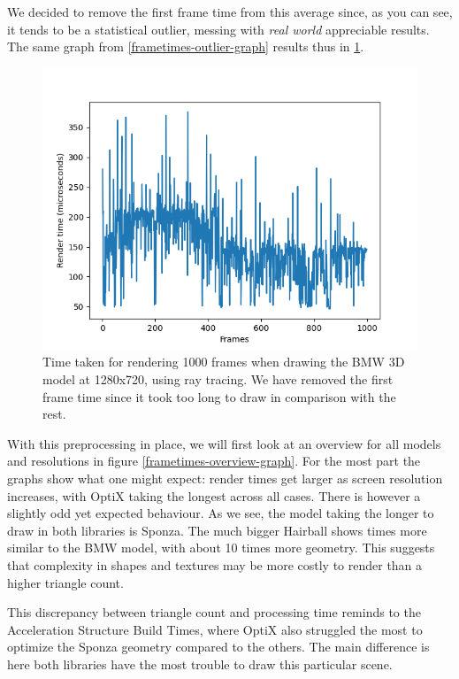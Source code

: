 We decided to remove the first frame time from this average since, as you can see, it tends to be a statistical outlier, messing with \textit{real world} appreciable results. The same graph from \ref{frametimes-outlier-graph} results thus in \ref{frametimes-no-outlier-graph}.

\begin{figure}[hbt!]
    \centering
    \includegraphics[width=1.0\textwidth]{figuras/frametimes-no-outlier.png}
    \caption{Time taken for rendering 1000 frames when drawing the BMW 3D model at 1280x720, using ray tracing. We have removed the first frame time since it took too long to draw in comparison with the rest.}
    \label{frametimes-no-outlier-graph}
\end{figure}

With this preprocessing in place, we will first look at an overview for all models and resolutions in figure \ref{frametimes-overview-graph}. For the most part the graphs show what one might expect: render times get larger as screen resolution increases, with OptiX taking the longest across all cases. There is however a slightly odd yet expected behaviour. As we see, the model taking the longer to draw in both libraries is Sponza. The much bigger Hairball shows times more similar to the BMW model, with about 10 times more geometry. This suggests that complexity in shapes and textures may be more costly to render than a higher triangle count. 

This discrepancy between triangle count and processing time reminds to the Acceleration Structure Build Times, where OptiX also struggled the most to optimize the Sponza geometry compared to the others. The main difference is here both libraries have the most trouble to draw this particular scene.

